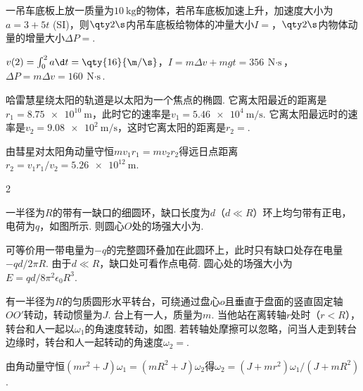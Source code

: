 \begin{problem}
    一吊车底板上放一质量为$\qty{10}\kg$的物体，若吊车底板加速上升，加速度大小为$a=3+5t$ (SI)，则$\qty2\s$内吊车底板给物体的冲量大小$I=$，$\qty2\s$内物体动量的增量大小$\Delta P=$.
\end{problem}
\begin{solution}
    $v(2)=\int_0^2a\d t=\qty{16}{\m/\s}$，$I=m\Delta v+mgt=\qty{356}{\N\cdot\s}$，$\Delta P=m\Delta v=\qty{160}{\N\cdot\s}$.
\end{solution}

\begin{problem}
    哈雷慧星绕太阳的轨道是以太阳为一个焦点的椭圆. 它离太阳最近的距离是$r_1=\qty{8.75e10}\m$，此时它的速率是$v_1=\qty{5.46e4}{\m/\s}$. 它离太阳最远时的速率是$v_2=\qty{9.08e2}{\m/\s}$，这时它离太阳的距离是$r_2=$.
\end{problem}
\begin{solution}
    由彗星对太阳角动量守恒$mv_1r_1=mv_2r_2$得远日点距离$r_2=v_1r_1/v_2=\qty{5.26e12}\m$.
\end{solution}

\begin{paracol}{2}
\begin{problem}
    一半径为$R$的带有一缺口的细圆环，缺口长度为$d$（$d\ll R$）环上均匀带有正电，电荷为$q$，如图所示. 则圆心$O$处的场强大小为.
    \switchcolumn\vspace*{\fill}\centering
    \vspace*{\fill}
\end{problem}
\switchcolumn
{}
\begin{solution}
    可等价用一带电量为$-q$的完整圆环叠加在此圆环上，此时只有缺口处存在电量$-qd/2\pi R$. 由于$d\ll R$，缺口处可看作点电荷. 圆心处的场强大小为$E=qd/8\pi^2\epsilon_0R^3$.
\end{solution}
\end{paracol}

\begin{problem}
    有一半径为$R$的匀质圆形水平转台，可绕通过盘心$o$且垂直于盘面的竖直固定轴$OO'$转动，转动惯量为$J$. 台上有一人，质量为$m$. 当他站在离转轴$r$处时（$r<R$），转台和人一起以$\omega_1$的角速度转动，如图. 若转轴处摩擦可以忽略，问当人走到转台边缘时，转台和人一起转动的角速度$\omega_2=$.
\end{problem}
\begin{solution}
    由角动量守恒$(mr^2+J)\omega_1=(mR^2+J)\omega_2$得$\omega_2=(J+mr^2)\omega_1/(J+mR^2)$.
\end{solution}

